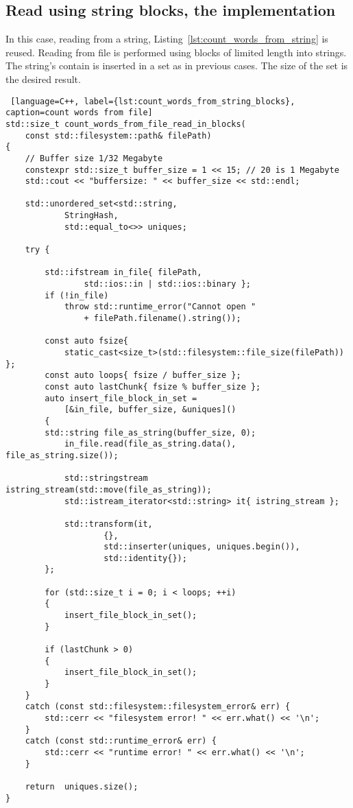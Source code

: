 \documentclass{article}
\begin{document}
\subsection{Read using string blocks, the implementation}

In this case, reading from a string, Listing~\ref{lst:count_words_from_string} is reused. Reading from file is performed using blocks of limited length into strings. The string's contain is inserted in a set as in previous cases. The size of the set is the desired result.

\begin{lstlisting} [language=C++, label={lst:count_words_from_string_blocks}, caption=count words from file]
std::size_t count_words_from_file_read_in_blocks(
	const std::filesystem::path& filePath)
{
    // Buffer size 1/32 Megabyte
    constexpr std::size_t buffer_size = 1 << 15; // 20 is 1 Megabyte
    std::cout << "buffersize: " << buffer_size << std::endl;

    std::unordered_set<std::string, 
    		StringHash, 
    		std::equal_to<>> uniques;
 
    try {
        
        std::ifstream in_file{ filePath, 
        		std::ios::in | std::ios::binary };
        if (!in_file)
            throw std::runtime_error("Cannot open " 
            	+ filePath.filename().string());

        const auto fsize{ 
        	static_cast<size_t>(std::filesystem::file_size(filePath)) };
        const auto loops{ fsize / buffer_size };
        const auto lastChunk{ fsize % buffer_size };
        auto insert_file_block_in_set = 
        	[&in_file, buffer_size, &uniques]()
        {
	    std::string file_as_string(buffer_size, 0);	
            in_file.read(file_as_string.data(), file_as_string.size());

            std::stringstream istring_stream(std::move(file_as_string));
            std::istream_iterator<std::string> it{ istring_stream };

            std::transform(it, 
            		{}, 
            		std::inserter(uniques, uniques.begin()), 
            		std::identity{});
        };

        for (std::size_t i = 0; i < loops; ++i) 
        {
            insert_file_block_in_set();
        }
        
        if (lastChunk > 0)
        {
            insert_file_block_in_set();
        }
    }
    catch (const std::filesystem::filesystem_error& err) {
        std::cerr << "filesystem error! " << err.what() << '\n';
    }
    catch (const std::runtime_error& err) {
        std::cerr << "runtime error! " << err.what() << '\n';
    }

    return  uniques.size();
}

\end{lstlisting}
\end{document}
